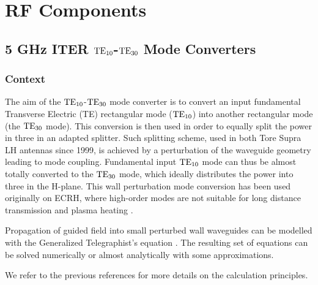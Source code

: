 {%
\section{RF Components}\label{sec:RF_components}

\subsection{5 GHz ITER ${\mathrm{TE}}_{10}$-${\mathrm{TE}}_{30}$ Mode Converters}\label{sec:mode_converter}

\subsubsection{Context}
The aim of the ${\mathrm{TE}}_{10}$-${\mathrm{TE}}_{30}$ mode converter is to convert an input fundamental Transverse Electric (TE) rectangular mode (${\mathrm{TE}}_{10}$) into another rectangular mode (the ${\mathrm{TE}}_{30}$ mode). This conversion is then used in order to equally split the power in three in an adapted splitter. Such splitting scheme, used in both Tore Supra LH antennas since 1999, is achieved by a perturbation of the waveguide geometry leading to mode coupling. Fundamental input ${\mathrm{TE}}_{10}$ mode can thus be almost totally converted to the ${\mathrm{TE}}_{30}$ mode, which ideally distributes the power into three in the H-plane. This wall perturbation mode conversion has been used originally on ECRH, where high-order modes are not suitable for long distance transmission and plasma heating \cite{thumm1987-1, thumm2002}. 

Propagation of guided field into small perturbed wall waveguides can be modelled with the Generalized Telegraphist's equation . The resulting set of equations can be solved numerically  or almost analytically with some approximations\cite{unger1958, solymar1959}. 

We refer to the previous references for more details on the calculation principles. 

}
